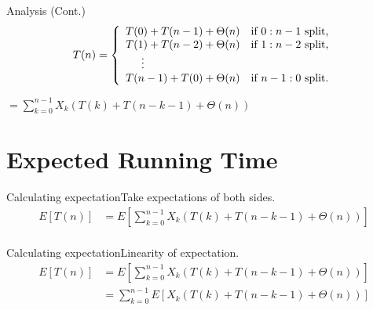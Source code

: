 \documentclass{beamer}
\begin{document}
\begin{frame}{Analysis (Cont.)}
    $$
        T(n) = \left\{
            \begin{array}{l l}
                T(0) + T(n - 1) + \Theta(n) & \text{if } 0 : n - 1 \text{ split,} \\
                T(1) + T(n - 2) + \Theta(n) & \text{if } 1 : n - 2 \text{ split,} \\
                \text{\hspace{5mm}} \vdots & \\
                T(n - 1) + T(0) + \Theta(n) & \text{if } n - 1 : 0 \text{ split.} \\
            \end{array}
        \right.
    $$

    \vspace{10mm}
    \centering
    \Large
    $= \sum\limits_{k=0}^{n-1} X_k(T(k) + T(n - k - 1) + \Theta(n))$
\end{frame}

\section{Expected Running Time}

\begin{frame}{Calculating expectation}{Take expectations of both sides.}
    \begin{equation*}
        \begin{split}
E[T(n)] &= E\left[ \sum\limits_{k=0}^{n-1} X_k(T(k) + T(n - k - 1) + \Theta(n)) \right] \\
        \end{split}
    \end{equation*}
\end{frame}

\begin{frame}{Calculating expectation}{Linearity of expectation.}
    \begin{equation*}
        \begin{split}
E[T(n)] &= E\left[ \sum\limits_{k=0}^{n-1} X_k(T(k) + T(n - k - 1) + \Theta(n)) \right] \\
        &= \sum\limits_{k=0}^{n-1} E\left[ X_k(T(k) + T(n - k - 1) + \Theta(n)) \right] \\
        \end{split}
    \end{equation*}
\end{frame}
\end{document}
